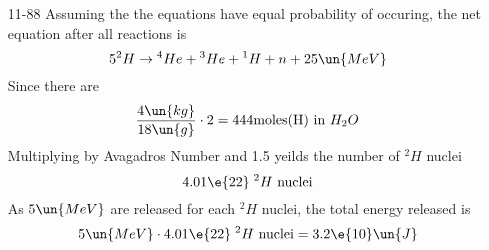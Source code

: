 \documentclass{2620hw}
\begin{document}
\begin{enumerate}
\begin{enumerate}
\end{enumerate}

\item [11-88] Assuming the the equations have equal probability of occuring, the net equation after all reactions is 
\[
	5 {}^{2}H \rightarrow {}^4He + {}^3He + {}^1H + n + 25 \un{MeV}
\]
Since there are
\[
	\frac{4\un{kg}}{18\un{g}}\cdot 2 = 444 \text{moles(H) in }H_2O
\]
Multiplying by Avagadros Number and  1.5 yeilds the number of ${}^2H$ nuclei
\[
	4.01\e{22}\; {}^2H \text{ nuclei}
\]
As $5\un{MeV}$ are released for each ${}^2H$ nuclei, the total energy released is 
\[
	5\un{MeV} \cdot 4.01\e{22}\; {}^2H \text{ nuclei} = 3.2\e{10}\un{J}
\]
 
\end{enumerate}
\end{document}
